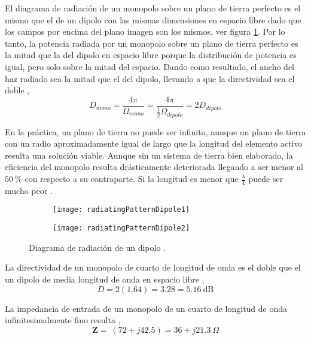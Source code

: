 El diagrama de radiación de un monopolo sobre un plano de tierra perfecto es el mismo que el de un dipolo con las mismas dimensiones en espacio libre dado que los campos por encima del plano imagen son los mismos, ver figura \ref{fig:radingPatternDipole}. Por lo tanto, la potencia radiada por un monopolo sobre un plano de tierra perfecto es la mitad que la del dipolo en espacio libre porque la distribución de potencia es igual, pero solo sobre la mitad del espacio. Dando como resultado, el ancho del haz radiado sea la mitad que el del dipolo, llevando a que la directividad sea el doble \cite{Stutzman2013},
\begin{equation}
  D_{mono} = \dfrac{4\pi}{\Omega_{mono}} = \dfrac{4\pi}{\frac{1}{2}\Omega_{dipolo}} = 2D_{dipolo}
\end{equation}

En la práctica, un plano de tierra no puede ser infinito, aunque un plano de tierra con un radio aproximadamente igual de largo que la longitud del elemento activo resulta una solución viable. Aunque sin un sistema de tierra bien elaborado, la eficiencia del monopolo resulta drásticamente deteriorada llegando a ser menor al $\SI{50}{\percent}$ con respecto a su contraparte. Si la longitud es menor que $\frac{\lambda}{4}$ puede ser mucho peor \cite{arrl2007}.

\begin{figure}
  \centering
  \begin{subfigure}[b]{0.4\textwidth}
    \texttt{[image: radiatingPatternDipole1]}
  \end{subfigure}
  \begin{subfigure}[b]{0.4\textwidth}
    \texttt{[image: radiatingPatternDipole2]}
  \end{subfigure}             
  \caption{Diagrama de radiación de un dipolo \cite{arrl2007}.}
  \label{fig:radingPatternDipole}
\end{figure}

La directividad de un monopolo de cuarto de longitud de onda es el doble que el un dipolo de media longitud de onda en espacio libre \cite{Stutzman2013},
\begin{equation}
  D = 2(1.64) = 3.28 = \SI{5.16}{\dB}
\end{equation}

La impedancia de entrada de un monopolo de un cuarto de longitud de onda infinitesimalmente fino resulta \cite{Stutzman2013},
\begin{equation}
  \bm{Z} = ~ (72 + j42.5) = 36 + j\SI{21.3}{\Omega}
\end{equation}

